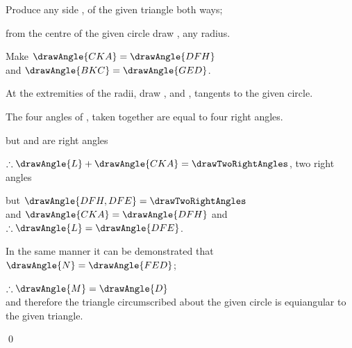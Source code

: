 \documentclass[booklanguage=english]{byrnebook}
\begin{document}
\begin{center}
Produce any side , of the given triangle both ways;

from the centre of the given circle draw , any radius.

Make $\drawAngle{CKA} = \drawAngle{DFH}$ \\
and $\drawAngle{BKC} = \drawAngle{GED}$.

At the extremities of the radii, draw ,  and , tangents to the given circle. 

The four angles of
,
taken together are equal to four right angles. 

but  and  are right angles \byref{\constref}

$\therefore \drawAngle{L} + \drawAngle{CKA} = \drawTwoRightAngles$, two right angles

but $\drawAngle{DFH,DFE} = \drawTwoRightAngles$ \\
and $\drawAngle{CKA} = \drawAngle{DFH}$ \byref{\constref} and $\therefore \drawAngle{L} = \drawAngle{DFE}$.

In the same manner it can be demonstrated that\\
$\drawAngle{N} = \drawAngle{FED}$;

$\therefore \drawAngle{M} = \drawAngle{D}$ \\
and therefore the triangle circumscribed about the given circle is equiangular to the given triangle.
\end{center}

\qed
\end{document}
